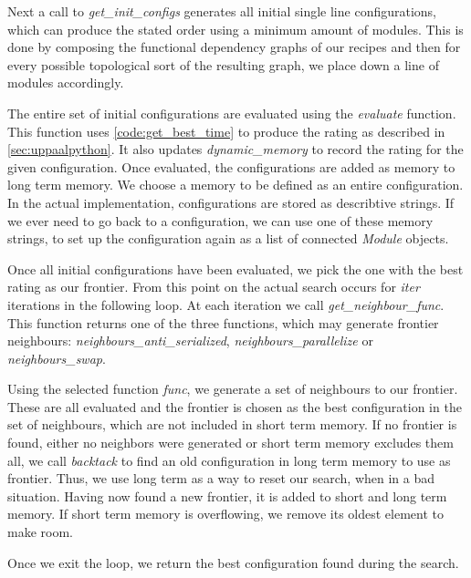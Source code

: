Next a call to \textit{get\_init\_configs} generates all initial single line configurations, which can produce the stated order using a minimum amount of modules. This is done by composing the functional dependency graphs of our recipes and then for every possible topological sort of the resulting graph, we place down a line of modules accordingly. 

The entire set of initial configurations are evaluated using the \textit{evaluate} function. This function uses  \cref{code:get_best_time} to produce the rating as described in \cref{sec:uppaalpython}. It also updates \textit{dynamic\_memory} to record the rating for the given configuration. Once evaluated, the configurations are added as memory to long term memory. We choose a memory to be defined as an entire configuration. In the actual implementation, configurations are stored as describtive strings. If we ever need to go back to a configuration, we can use one of these memory strings, to set up the configuration again as a list of connected \textit{Module} objects.

Once all initial configurations have been evaluated, we pick the one with the best rating as our frontier. From this point on the actual search occurs for \textit{iter} iterations in the following loop. At each iteration we call \textit{get\_neighbour\_func}. This function returns one of the three functions, which may generate frontier neighbours: \textit{neighbours\_anti\_serialized}, \textit{neighbours\_parallelize} or \textit{neighbours\_swap}.

Using the selected function \textit{func}, we generate a set of neighbours to our frontier. These are all evaluated and the frontier is chosen as the best configuration in the set of neighbours, which are not included in short term memory. If no frontier is found, either no neighbors were generated or short term memory excludes them all, we call \textit{backtack} to find an old configuration in long term memory to use as frontier. Thus, we use long term as a way to reset our search, when in a bad situation. Having now found a new frontier, it is added to short and long term memory. If short term memory is overflowing, we remove its oldest element to make room. 

Once we exit the loop, we return the best configuration found during the search. 